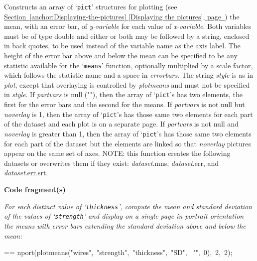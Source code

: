 \documentclass{book}
\makeatletter
\newcommand\Texinfocommandstyletextvar[1]{{\normalfont{}\textsl{#1}}}%
\newenvironment{Texinfopreformatted}{%
  \par\GNUTobeylines\obeyspaces\frenchspacing\parskip=\z@\parindent=\z@}{}
{\catcode`\^^M=13 \gdef\GNUTobeylines{\catcode`\^^M=13 \def^^M{\null\par}}}
\newenvironment{Texinfoindented}{\begin{list}{}{}\item\relax}{\end{list}}
\renewcommand{\_}{\Texinfounderscore\discretionary{}{}{}}
\makeatother
\begin{document}
Constructs an array of `\texttt{pict}' structures for
plotting (see \hyperref[anchor:Displaying-the-pictures]{Section~\ref*{anchor:Displaying-the-pictures} [Displaying the pictures], page~\pageref*{anchor:Displaying-the-pictures}})
the mean, with an error bar, of \Texinfocommandstyletextvar{y-variable} for each value of \Texinfocommandstyletextvar{x-variable}.
Both variables must be of type double and either or both may be followed by
a string, enclosed in back quotes,
to be used instead of the variable name as the axis label.
The height of the error bar above and below the mean
can be specified to be any statistic available for the `\texttt{means}' function,
optionally multiplied by a scale factor, which follows the statistic name and
a space in \Texinfocommandstyletextvar{errorbars}.
The string \Texinfocommandstyletextvar{style} is as in \Texinfocommandstyletextvar{plot}, except that overlaying is controlled
by \Texinfocommandstyletextvar{plotmeans} and must not be specified in \Texinfocommandstyletextvar{style}.
If \Texinfocommandstyletextvar{partvars} is null (""), then the array of `\texttt{pict}'s has two elements, the first for
the error bars and the second for the means.
If \Texinfocommandstyletextvar{partvars} is not null but \Texinfocommandstyletextvar{noverlay} is 1,
then the array of `\texttt{pict}'s has those same two elements
for each part of the dataset and each plot is on a separate page.
If \Texinfocommandstyletextvar{partvars} is not null and \Texinfocommandstyletextvar{noverlay} is greater than 1,
then the array of `\texttt{pict}'s has those same two elements
for each part of the dataset but the elements are linked so that \Texinfocommandstyletextvar{noverlay}
pictures appear on the same set of axes.
NOTE: this function creates the following datasets or overwrites them if they exist:
\Texinfocommandstyletextvar{dataset}.mns, \Texinfocommandstyletextvar{dataset}.err, and \Texinfocommandstyletextvar{dataset}.err.srt.

\noindent{}\textbf{Code fragment(s)}

\emph{For each distinct value of `\texttt{thickness}', compute
the mean and standard deviation of the values of `\texttt{strength}'
and display on a single page in portrait orientation
the means with error bars extending the standard
deviation above and below the mean:}
\begin{Texinfoindented}
\begin{Texinfopreformatted}%
\ttfamily nport(plotmeans("wires",\ "strength",\ "thickness",\ "SD",
\                                                 "",\ 0),\ 2,\ 2);
\end{Texinfopreformatted}
\end{Texinfoindented}
\end{document}
